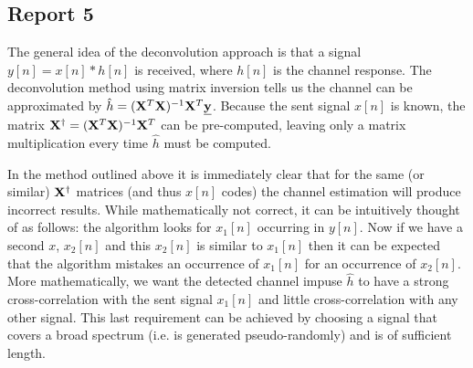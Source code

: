 \documentclass[11pt,titlepage]{report}
\begin{document}
\subsection{Report 5}
The general idea of the deconvolution approach is that a signal $y[n]=x[n]*h[n]$ is received, where $h[n]$ is the channel response. The deconvolution method using matrix inversion tells us the channel can be approximated by $\hat{h}=(\mathbf{X}^T\mathbf{X})^{-1}\mathbf{X}^T\mathbf{\underline{y}}$. Because the sent signal $x[n]$ is known, the matrix $\mathbf{X}^\dagger=(\mathbf{X}^T\mathbf{X})^{-1}\mathbf{X}^T$ can be pre-computed, leaving only a matrix multiplication every time $\hat{h}$ must be computed. 

In the method outlined above it is immediately clear that for the same (or similar) $\mathbf{X}^\dagger$ matrices (and thus $x[n]$ codes) the channel estimation will produce incorrect results. While mathematically not correct, it can be intuitively thought of as follows: the algorithm looks for $x_1[n]$ occurring in $y[n]$. Now if we have a second $x$, $x_2[n]$ and this $x_2[n]$ is similar to $x_1[n]$ then it can be expected that the algorithm mistakes an occurrence of $x_1[n]$ for an occurrence of $x_2[n]$. More mathematically, we want the detected channel impuse $\hat{h}$ to have a strong cross-correlation with the sent signal $x_1[n]$ and little cross-correlation with any other signal. This last requirement can be achieved by choosing a signal that covers a broad spectrum (i.e. is generated pseudo-randomly) and is of sufficient length.
\end{document}

